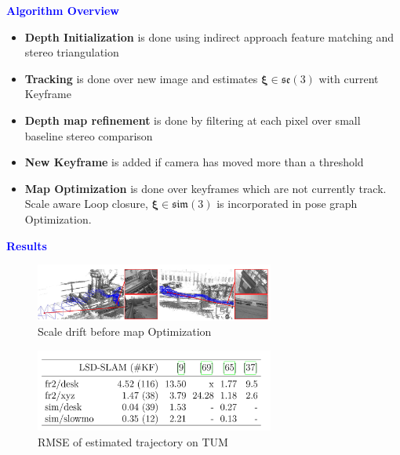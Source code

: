 \documentclass[aspectratio=169]{beamer}
\begin{document}
\begin{frame}{\textcolor{blue}{\textbf{Algorithm Overview}}}
	\vspace{-0.5cm}
	\begin{itemize}
			\item \textbf{Depth Initialization} is done using indirect approach feature matching and stereo triangulation
			\item \textbf{Tracking} is done over new image and estimates $\boldsymbol{\xi} \in \mathfrak{s e}(3)$ with current Keyframe
			\item \textbf{Depth map refinement} is done by filtering at each pixel over small baseline stereo comparison
			\item \textbf{New Keyframe} is added if camera has moved more than a threshold
			\item \textbf{Map Optimization} is done over keyframes which are not currently track. Scale aware Loop closure, $\boldsymbol{\xi} \in \mathfrak{sim}(3)$ is incorporated in pose graph Optimization. 
	\end{itemize}


\end{frame}


\begin{frame}{\textcolor{blue}{\textbf{Results}}}
	\vspace{-0.8cm}
\begin{figure}
	\centering
	\includegraphics[width=0.7\textwidth]{pics/scale_drift_lsd_slam.png}
	\caption{Scale drift before map Optimization}
\end{figure}

\vspace{-0.8cm}

\begin{figure}
	\centering
	\includegraphics[width=0.7\textwidth]{pics/rmse_lsd.png}
	\caption{RMSE of estimated trajectory on TUM}
\end{figure}
\end{frame}
\end{document}
